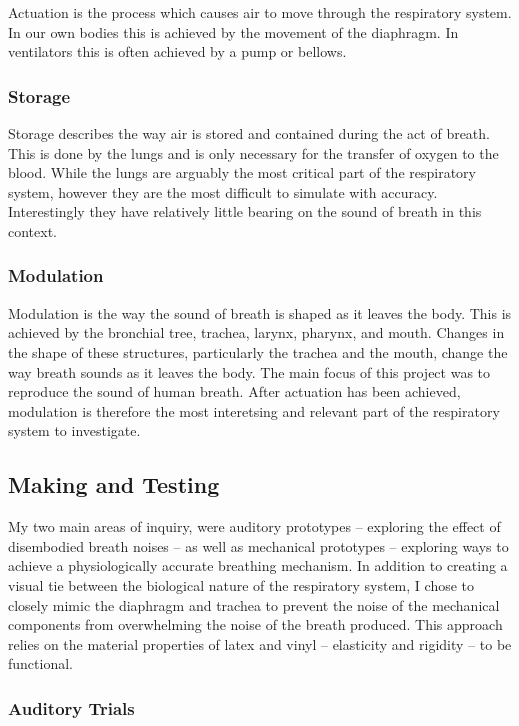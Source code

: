\documentclass[letterpaper]{article}
\begin{document}
Actuation is the process which causes air to move through the respiratory system. In our own bodies this is achieved by the movement of the diaphragm. In ventilators this is often achieved by a pump or bellows.

\subsubsection{Storage}

Storage describes the way air is stored and contained during the act of breath. This is done by the lungs and is only necessary for the transfer of oxygen to the blood. While the lungs are arguably the most critical part of the respiratory system, however they are the most difficult to simulate with accuracy. Interestingly they have relatively little bearing on the sound of breath in this context.

\subsubsection{Modulation}

Modulation is the way the sound of breath is shaped as it leaves the body. This is achieved by the bronchial tree, trachea, larynx, pharynx, and mouth.\cite{sarkar} Changes in the shape of these structures, particularly the trachea and the mouth, change the way breath sounds as it leaves the body. The main focus of this project was to reproduce the sound of human breath. After actuation has been achieved, modulation is therefore the most interetsing and relevant part of the respiratory system to investigate.

\subsection{Making and Testing}

My two main areas of inquiry, were auditory prototypes -- exploring the effect of disembodied breath noises -- as well as mechanical prototypes -- exploring ways to achieve a physiologically accurate breathing mechanism. In addition to creating a visual tie between the biological nature of the respiratory system, I chose to closely mimic the diaphragm and trachea to prevent the noise of the mechanical components from overwhelming the noise of the breath produced. This approach relies on the material properties of latex and vinyl -- elasticity and rigidity -- to be functional.

\subsubsection{Auditory Trials}
\end{document}
